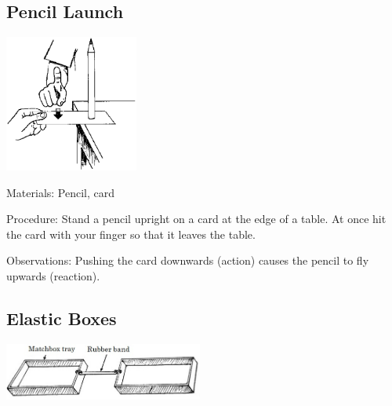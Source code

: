 \begin{multicols}{2}
\subsection{Pencil Launch}

\begin{center}
\includegraphics[width=0.33\textwidth]{./img/source/pencil-launch.png}
\end{center}

\begin{description*}
\item[Materials:]{Pencil, card}
\item[Procedure:]{Stand a pencil upright on a card at the edge of a table. At once hit the card with your finger so that it leaves the table.}
\item[Observations:]{Pushing the card downwards (action) causes the pencil to fly upwards (reaction).}
\end{description*}

\columnbreak

\subsection{Elastic Boxes}

\begin{center}
\includegraphics[width=0.49\textwidth]{./img/n3-matchbox.jpg}
\end{center}


\end{multicols}

